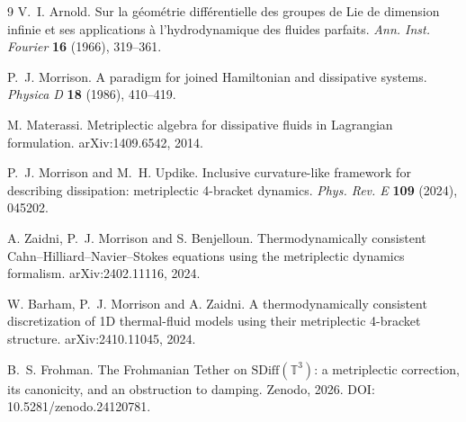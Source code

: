 \documentclass[11pt,a4paper]{article}
\begin{document}
\begin{thebibliography}{9}
V.~I. Arnold.
\newblock Sur la géométrie différentielle des groupes de Lie de dimension infinie et ses applications à l'hydrodynamique des fluides parfaits.
\newblock \emph{Ann. Inst. Fourier} \textbf{16} (1966), 319--361.

P.~J. Morrison.
\newblock A paradigm for joined Hamiltonian and dissipative systems.
\newblock \emph{Physica D} \textbf{18} (1986), 410--419.

M. Materassi.
\newblock Metriplectic algebra for dissipative fluids in Lagrangian formulation.
\newblock arXiv:1409.6542, 2014.

P.~J. Morrison and M.~H. Updike.
\newblock Inclusive curvature-like framework for describing dissipation: metriplectic 4-bracket dynamics.
\newblock \emph{Phys. Rev. E} \textbf{109} (2024), 045202.

A. Zaidni, P.~J. Morrison and S. Benjelloun.
\newblock Thermodynamically consistent Cahn--Hilliard--Navier--Stokes equations using the metriplectic dynamics formalism.
\newblock arXiv:2402.11116, 2024.

W. Barham, P.~J. Morrison and A. Zaidni.
\newblock A thermodynamically consistent discretization of 1D thermal-fluid models using their metriplectic 4-bracket structure.
\newblock arXiv:2410.11045, 2024.

B.~S. Frohman.
\newblock The Frohmanian Tether on \(\mathrm{SDiff}(\mathbb{T}^3)\): a metriplectic correction, its canonicity, and an obstruction to damping.
\newblock Zenodo, 2026. DOI: 10.5281/zenodo.24120781.
\end{thebibliography}
\end{document}
